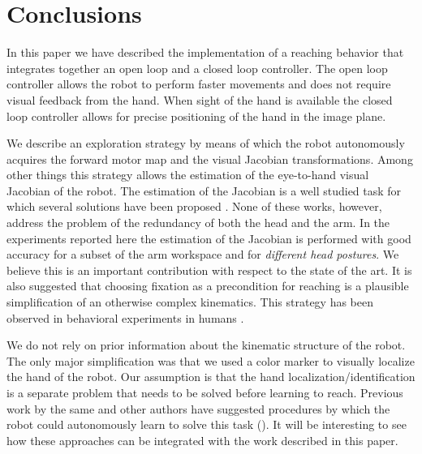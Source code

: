 \section{Conclusions}
In this paper we have described the implementation of a reaching
behavior that integrates together an open loop and a closed 
loop controller. The open loop controller
allows the robot to perform faster movements and does not require visual 
feedback from the hand. When sight of the hand is available the closed
loop controller allows for precise positioning of the hand in the 
image plane. 

We describe an exploration strategy by means of which the robot autonomously 
acquires the forward motor map and the visual Jacobian transformations. 
Among other things this strategy 
allows the estimation of the eye-to-hand visual Jacobian of the robot. 
The estimation of the Jacobian is a well studied task for which several 
solutions have been proposed \cite{Hosoda94versatile,Mansard06jacobian,
Lapreste04efficient}. None of these works, however, address the 
problem of the redundancy of both the head and the arm. In the experiments 
reported here the estimation of the Jacobian is performed with good 
accuracy for a subset of the arm workspace and for 
\emph{different head postures}. We believe
this is an important contribution with respect to the state of the art.
It is also suggested that choosing fixation as a precondition for reaching
is a plausible simplification of an otherwise complex kinematics. This 
strategy has been observed in behavioral experiments in humans 
\cite{flanders-daghestani-berthoz-1999}.

We do not rely on prior information about the 
kinematic structure of the robot. The only major simplification was that we used 
a color marker to visually localize the hand of the robot. Our assumption
is that the hand localization/identification is a separate problem
that needs to be solved before learning to reach. Previous work
by the same and other authors have suggested procedures by which 
the robot could autonomously learn to solve this task 
(\cite{Natale05,edsinger06what}). It will be interesting to see
how these approaches can be integrated with the work described 
in this paper.
